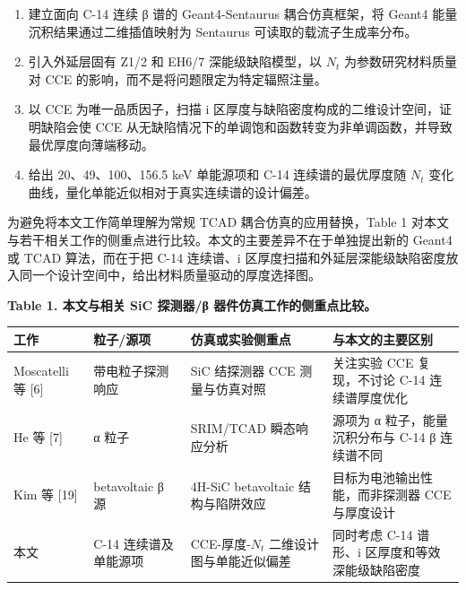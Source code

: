 \documentclass[
  10pt,
  a4paper,
]{ctexart}
\newcounter{none} %
\providecommand{\tightlist}{%
  \setlength{\itemsep}{0pt}\setlength{\parskip}{0pt}}
\begin{document}
\begin{enumerate}
\def\labelenumi{\arabic{enumi}.}
\tightlist
\item
  建立面向 C-14 连续 β 谱的 Geant4-Sentaurus 耦合仿真框架，将 Geant4
  能量沉积结果通过二维插值映射为 Sentaurus 可读取的载流子生成率分布。
\item
  引入外延层固有 Z1/2 和 EH6/7 深能级缺陷模型，以 \(N_t\)
  为参数研究材料质量对 CCE 的影响，而不是将问题限定为特定辐照注量。
\item
  以 CCE 为唯一品质因子，扫描 i
  区厚度与缺陷密度构成的二维设计空间，证明缺陷会使 CCE
  从无缺陷情况下的单调饱和函数转变为非单调函数，并导致最优厚度向薄端移动。
\item
  给出 20、49、100、156.5 keV 单能源项和 C-14 连续谱的最优厚度随 \(N_t\)
  变化曲线，量化单能近似相对于真实连续谱的设计偏差。
\end{enumerate}

为避免将本文工作简单理解为常规 TCAD 耦合仿真的应用替换，Table 1
对本文与若干相关工作的侧重点进行比较。本文的主要差异不在于单独提出新的
Geant4 或 TCAD 算法，而在于把 C-14 连续谱、i
区厚度扫描和外延层深能级缺陷密度放入同一个设计空间中，给出材料质量驱动的厚度选择图。

\textbf{Table 1. 本文与相关 SiC 探测器/β 器件仿真工作的侧重点比较。}

{\def\LTcaptype{none} %
\begin{longtable}[]{@{}
  >{\raggedright\arraybackslash}p{}
  >{\raggedright\arraybackslash}p{}
  >{\raggedright\arraybackslash}p{}
  >{\raggedright\arraybackslash}p{}@{}}
\toprule\noalign{}
\begin{minipage}[b]{\linewidth}\raggedright
工作
\end{minipage} & \begin{minipage}[b]{\linewidth}\raggedright
粒子/源项
\end{minipage} & \begin{minipage}[b]{\linewidth}\raggedright
仿真或实验侧重点
\end{minipage} & \begin{minipage}[b]{\linewidth}\raggedright
与本文的主要区别
\end{minipage} \\
\midrule\noalign{}
\endhead
\bottomrule\noalign{}
\endlastfoot
Moscatelli 等 {[}6{]} & 带电粒子探测响应 & SiC 结探测器 CCE
测量与仿真对照 & 关注实验 CCE 复现，不讨论 C-14 连续谱厚度优化 \\
He 等 {[}7{]} & α 粒子 & SRIM/TCAD 瞬态响应分析 & 源项为 α
粒子，能量沉积分布与 C-14 β 连续谱不同 \\
Kim 等 {[}19{]} & betavoltaic β 源 & 4H-SiC betavoltaic 结构与陷阱效应 &
目标为电池输出性能，而非探测器 CCE 与厚度设计 \\
本文 & C-14 连续谱及单能源项 & CCE-厚度-\(N_t\) 二维设计图与单能近似偏差
& 同时考虑 C-14 谱形、i 区厚度和等效深能级缺陷密度 \\
\end{longtable}
}
\end{document}
